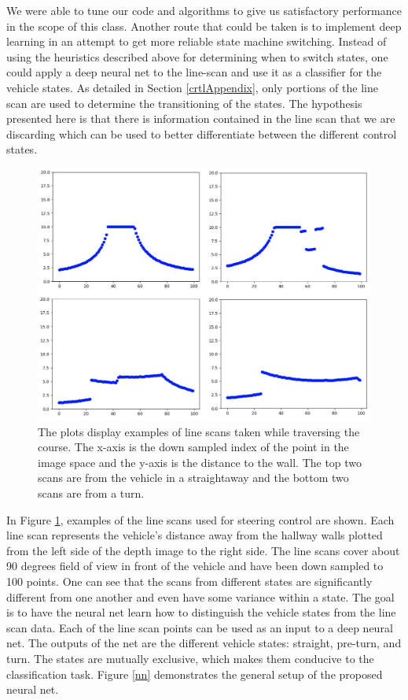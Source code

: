 \documentclass[letterpaper, 10 pt, conference]{ieeeconf}  %
\begin{document}
We were able to tune our code and algorithms to give us satisfactory performance in the scope of this class. Another route that could be taken is to implement deep learning in an attempt to get more reliable state machine switching. Instead of using the heuristics described above for determining when to switch states, one could apply a deep neural net to the line-scan and use it as a classifier for the vehicle states. As detailed in Section \ref{crtlAppendix}, only portions of the line scan are used to determine the transitioning of the states. The hypothesis presented here is that there is information contained in the line scan that we are discarding which can be used to better differentiate between the different control states. 

\begin{figure}[tp]
\begin{center}
\includegraphics[width=.48\textwidth]{Figures/line_scans.png}
\caption{The plots display examples of line scans taken while traversing the course. The x-axis is the down sampled index of the point in the image space and the y-axis is the distance to the wall. The top two scans are from the vehicle in a straightaway and the bottom two scans are from a turn.}
\label{ls}
\end{center}
\end{figure}

In Figure \ref{ls}, examples of the line scans used for steering control are shown. Each line scan represents the vehicle's distance away from the hallway walls plotted from the left side of the depth image to the right side. The line scans cover about 90 degrees field of view in front of the vehicle and have been down sampled to 100 points. One can see that the scans from different states are significantly different from one another and even have some variance within a state. The goal is to have the neural net learn how to distinguish the vehicle states from the line scan data. Each of the line scan points can be used as an input to a deep neural net. The outputs of the net are the different vehicle states: straight, pre-turn, and turn. The states are mutually exclusive, which makes them conducive to the classification task. Figure \ref{nn} demonstrates the general setup of the proposed neural net.
\end{document}
